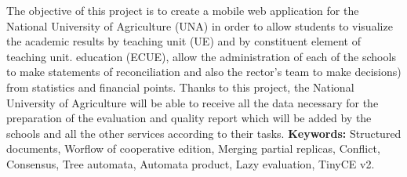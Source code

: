 \let\oldprintchaptertitle=\printchaptertitle
\renewcommand{\printchaptertitle}[1]{%
	\vspace*{-75pt}
	\oldprintchaptertitle{#1}
}%
\let\printchaptertitle=\oldprintchaptertitle
The objective of this project is to create a mobile web application for the National University of Agriculture (UNA) in order to allow students to visualize the academic results by teaching unit (UE) and by constituent element of teaching unit. education (ECUE), allow the administration of each of the schools to make statements of reconciliation and also the rector's team to make decisions) from statistics and financial points. 
Thanks to this project, the National University of Agriculture will be able to receive all the data necessary for the preparation of the evaluation and quality report which will be added by the schools and all the other services according to their tasks.
\vspace{1cm}
\noindent\textbf{Keywords:} Structured documents, Worflow of cooperative edition, Merging partial replicas, Conflict, Consensus, Tree automata, Automata product, Lazy evaluation, TinyCE v2.

\myCleanStarChapterEnd
